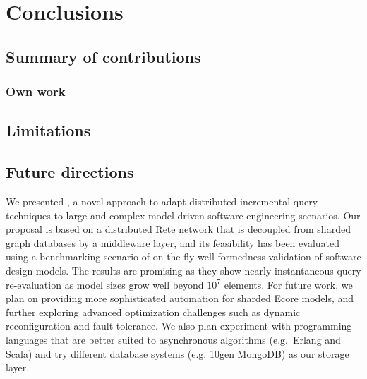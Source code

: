 \chapter{Conclusions}
\label{chap:conclusions}

\section{Summary of contributions}

\subsection{Own work}

\section{Limitations}

\section{Future directions}

We presented \iqd{}, a novel approach to adapt distributed incremental query techniques to large and complex model driven software engineering scenarios. Our proposal is based on a distributed Rete network that is decoupled from sharded graph databases by a middleware layer, and its feasibility has been evaluated using a benchmarking scenario of on-the-fly well-formedness validation of software design models. The results are promising as they show nearly instantaneous query re-evaluation as model sizes grow well beyond $10^7$ elements.
For future work, we plan on providing more sophisticated automation for sharded Ecore models, and further exploring advanced optimization challenges such as dynamic reconfiguration and fault tolerance.
We also plan experiment with programming languages that are better suited to asynchronous algorithms (e.g.\ Erlang and Scala) and try different database systems (e.g. 10gen MongoDB) as our storage layer.

